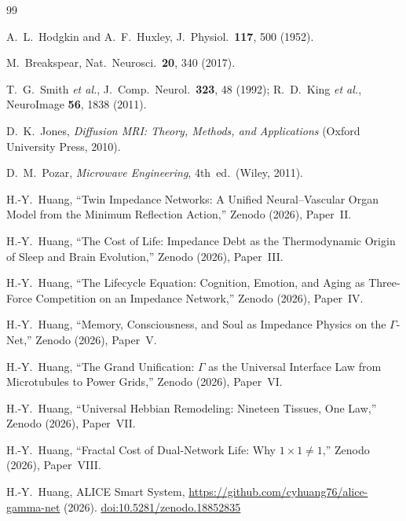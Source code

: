 \documentclass[aps,pre,twocolumn,superscriptaddress,floatfix]{revtex4-2}
\begin{document}
\begin{thebibliography}{99}

A.~L.~Hodgkin and A.~F.~Huxley,
J.~Physiol.\ \textbf{117}, 500 (1952).

M.~Breakspear,
Nat.\ Neurosci.\ \textbf{20}, 340 (2017).

T.~G.~Smith \textit{et al.},
J.~Comp.\ Neurol.\ \textbf{323}, 48 (1992);
R.~D.~King \textit{et al.},
NeuroImage \textbf{56}, 1838 (2011).

D.~K.~Jones,
\textit{Diffusion MRI: Theory, Methods, and Applications}
(Oxford University Press, 2010).

D.~M.~Pozar, \emph{Microwave Engineering}, 4th~ed.\
(Wiley, 2011).

H.-Y.~Huang, ``Twin Impedance Networks: A Unified
Neural--Vascular Organ Model from the Minimum Reflection
Action,'' Zenodo (2026), Paper~II.

H.-Y.~Huang, ``The Cost of Life: Impedance Debt as the
Thermodynamic Origin of Sleep and Brain Evolution,''
Zenodo (2026), Paper~III.

H.-Y.~Huang, ``The Lifecycle Equation: Cognition, Emotion,
and Aging as Three-Force Competition on an Impedance
Network,'' Zenodo (2026), Paper~IV.

H.-Y.~Huang, ``Memory, Consciousness, and Soul as Impedance
Physics on the $\Gamma$-Net,'' Zenodo (2026), Paper~V.

H.-Y.~Huang, ``The Grand Unification: $\Gamma$ as the
Universal Interface Law from Microtubules to Power Grids,''
Zenodo (2026), Paper~VI.

H.-Y.~Huang, ``Universal Hebbian Remodeling: Nineteen
Tissues, One Law,'' Zenodo (2026), Paper~VII.

H.-Y.~Huang, ``Fractal Cost of Dual-Network Life: Why
$1 \times 1 \neq 1$,'' Zenodo (2026), Paper~VIII.

H.-Y.~Huang,
ALICE Smart System,
\url{https://github.com/cyhuang76/alice-gamma-net} (2026).
\href{https://doi.org/10.5281/zenodo.18852835}{doi:10.5281/zenodo.18852835}

\end{thebibliography}
\end{document}
